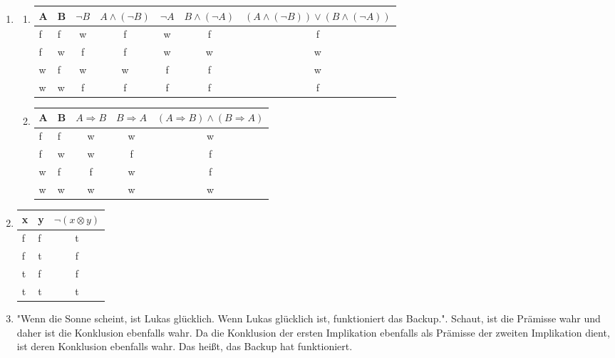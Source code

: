 \documentclass[a4paper]{article}
\begin{document}
\begin{enumerate}
		\item
		\begin{enumerate}
			\item
			\begin{tabular}{|l|l|c|c|c|c|c|}
				\firsthline
					A & B & $\lnot B$ & $A \land (\lnot B)$ & $\lnot A$ & $B \land (\lnot A)$ & $(A \land (\lnot B)) \lor (B \land (\lnot A))$ \\
				\hline
					f & f & w & f & w & f & f \\
					f & w & f & f & w & w & w \\
					w & f & w & w & f & f & w \\
					w & w & f & f & f & f & f \\
				\hline
			\end{tabular}
			
			\item
			\begin{tabular}{|l|l|c|c|c|}
				\firsthline
				A & B & $A \Rightarrow B$ & $B \Rightarrow A$ & $(A \Rightarrow B) \land (B \Rightarrow A)$ \\
				\hline
				f & f & w & w & w \\
				f & w & w & f & f \\
				w & f & f & w & f \\
				w & w & w & w & w \\
				\hline
			\end{tabular}
		\end{enumerate}
		
		\item
		\begin{tabular}{|l|l|c|}
			\firsthline
			x & y & $\lnot (x \otimes y)$ \\
			\hline
			f & f & t \\
			f & t & f \\
			t & f & f \\
			t & t & t \\
			\hline
		\end{tabular}
		
		\item
		"Wenn die Sonne scheint, ist Lukas glücklich. Wenn Lukas glücklich ist, funktioniert das Backup.". Schaut, ist die Prämisse wahr und daher ist die Konklusion ebenfalls wahr. Da die Konklusion der ersten Implikation ebenfalls als Prämisse der zweiten Implikation dient, ist deren Konklusion ebenfalls wahr. Das heißt, das Backup hat funktioniert.
	\end{enumerate}
\end{document}
